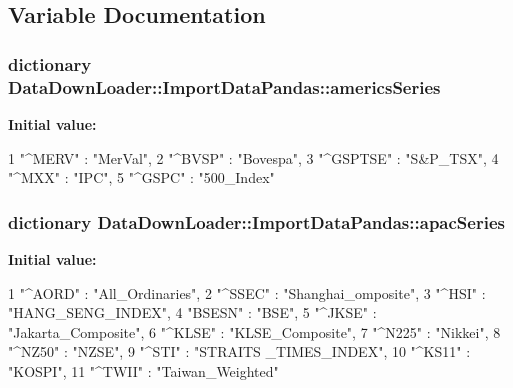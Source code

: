 \subsection{\-Variable \-Documentation}
\hypertarget{namespaceDataDownLoader_1_1ImportDataPandas_ac94edd50b87fbf14ddc3f63e0488380a}{
\subsubsection[{americs\-Series}]{\setlength{\rightskip}{0pt plus 5cm}dictionary \-Data\-Down\-Loader\-::\-Import\-Data\-Pandas\-::americs\-Series}}\label{namespaceDataDownLoader_1_1ImportDataPandas_ac94edd50b87fbf14ddc3f63e0488380a}
{\bfseries \-Initial value\-:}
\begin{DoxyCode}
1 { "^MERV" : "MerVal",
2                  "^BVSP" : "Bovespa",   
3                  "^GSPTSE" : "S&P_TSX",
4                  "^MXX" : "IPC",
5                  "^GSPC" : "500_Index"}
\end{DoxyCode}
\hypertarget{namespaceDataDownLoader_1_1ImportDataPandas_af33dc089b4a238e66a3764949c952998}{
\subsubsection[{apac\-Series}]{\setlength{\rightskip}{0pt plus 5cm}dictionary \-Data\-Down\-Loader\-::\-Import\-Data\-Pandas\-::apac\-Series}}\label{namespaceDataDownLoader_1_1ImportDataPandas_af33dc089b4a238e66a3764949c952998}
{\bfseries \-Initial value\-:}
\begin{DoxyCode}
1 { "^AORD" :   "All_Ordinaries",    
2                 "^SSEC" :    "Shanghai_omposite",
3                 "^HSI" : "HANG_SENG_INDEX",
4                 "BSESN" : "BSE",
5                 "^JKSE" : "Jakarta_Composite",    
6                 "^KLSE" : "KLSE_Composite",
7                 "^N225" : "Nikkei",
8                 "^NZ50" : "NZSE",
9                 "^STI" : "STRAITS _TIMES_INDEX",
10                 "^KS11" : "KOSPI",
11                 "^TWII" : "Taiwan_Weighted" }
\end{DoxyCode}
